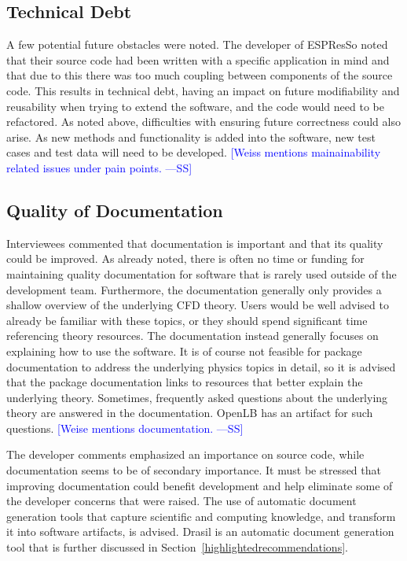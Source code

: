 \documentclass[final, 3p, times, authoryear]{elsarticle}
\newcommand{\authornote}[3]{\textcolor{#1}{[#3 ---#2]}}
\newcommand{\authornote}[3]{}
\newcommand{\wss}[1]{\authornote{blue}{SS}{#1}} %
\begin{document}
\subsection{Technical Debt}

A few potential future obstacles were noted. The developer of ESPResSo noted
that their source code had been written with a specific application in mind and
that due to this there was too much coupling between components of the source
code. This results in technical debt, having an impact on future modifiability
and reusability when trying to extend the software, and the code would need to
be refactored.  As noted above, difficulties with ensuring future correctness
could also arise. As new methods and functionality is added into the software,
new test cases and test data will need to be developed.  \wss{Weiss mentions
mainainability related issues under pain points.}

\subsection{Quality of Documentation}

Interviewees commented that documentation is important and that its quality
could be improved. As already noted, there is often no time or funding for
maintaining quality documentation for software that is rarely used outside of
the development team. Furthermore, the documentation generally only provides a
shallow overview of the underlying CFD theory. Users would be well advised to
already be familiar with these topics, or they should spend significant time
referencing theory resources. The documentation instead generally focuses on
explaining how to use the software. It is of course not feasible for package
documentation to address the underlying physics topics in detail, so it is
advised that the package documentation links to resources that better explain
the underlying theory. Sometimes, frequently asked questions about the
underlying theory are answered in the documentation. OpenLB has an artifact for
such questions.  \wss{Weise mentions documentation.}

The developer comments emphasized an importance on source code, while
documentation seems to be of secondary importance. It must be stressed that
improving documentation could benefit development and help eliminate some of the
developer concerns that were raised. The use of automatic document generation
tools that capture scientific and computing knowledge, and transform it into
software artifacts, is advised. Drasil is an automatic document generation tool
that is further discussed in Section~\ref{highlightedrecommendations}.
\end{document}
